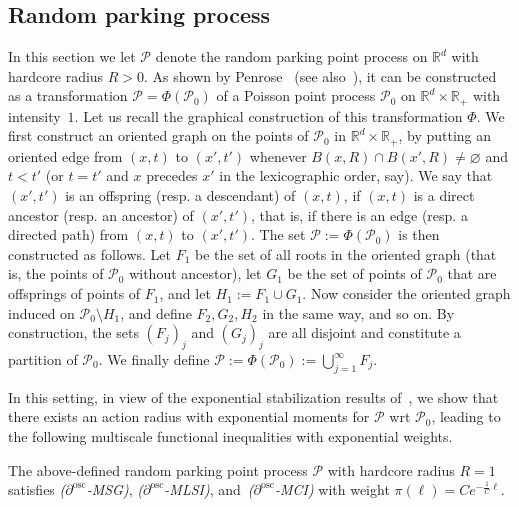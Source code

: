 \documentclass[AHL,Unicode,longabstracts]{cedram}
\newcommand{\R}{\mathbb R}
\newcommand{\Pc}{\mathcal P}
\newcommand{\osc}{\partial^{\mathrm{osc}}}
\begin{document}
\subsection{Random parking process}\label{chap:RPM}
In this section we let $\Pc$ denote the random parking point process on $\R^d$ with hardcore radius $R>0$. As shown by Penrose~\cite{Penrose-01} (see also~\cite[Section~2.1]{Gloria-Penrose-13}), it can be constructed as a transformation $\Pc=\Phi(\Pc_0)$ of a Poisson point process $\Pc_0$ on $\R^d\times\R_+$ with intensity~$1$. Let us recall the graphical construction of this transformation $\Phi$. We first construct an oriented graph on the points of $\Pc_0$ in $\R^d\times\R_+$, by putting an oriented edge from $(x,t)$ to $(x',t')$ whenever $B(x,R)\cap B(x',R)\ne\varnothing$ and $t<t'$ (or $t=t'$ and $x$ precedes $x'$ in the lexicographic order, say). We say that $(x',t')$ is an offspring (resp. a descendant) of $(x,t)$, if $(x,t)$ is a direct ancestor (resp. an ancestor) of $(x',t')$, that is, if there is an edge (resp. a directed path) from $(x,t)$ to $(x',t')$. The set $\Pc:=\Phi(\Pc_0)$ is then constructed as follows. Let $F_1$ be the set of all roots in the oriented graph (that is, the points of $\Pc_0$ without ancestor), let $G_1$ be the set of points of $\Pc_0$ that are offsprings of points of $F_1$, and let $H_1:=F_1\cup G_1$. Now consider the oriented graph induced on $\Pc_0\setminus H_1$, and define $F_2,G_2,H_2$ in the same way, and so on. By construction, the sets $(F_j)_j$ and $(G_j)_j$ are all disjoint and constitute a partition of $\Pc_0$. We finally define $\Pc:=\Phi(\Pc_0):=\bigcup_{j=1}^\infty F_j$.

In this setting, in view of the exponential stabilization results of~\cite{Schreiber-Penrose-Yukich-07}, we show that there exists an action radius with exponential moments for $\Pc$ wrt $\Pc_0$, leading to the following multiscale functional inequalities with exponential weights.

\begin{prop}\label{prop:rpm}
The above-defined random parking point process $\Pc$ with hardcore radius $R=1$ satisfies
\emph{($\osc$-MSG)}, \emph{($\osc$-MLSI)}, and~\emph{($\osc$-MCI)} with weight $\pi(\ell)=Ce^{-\frac1{C}\ell}$.
\end{prop}
\end{document}
